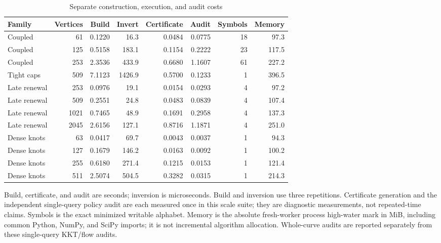 \begin{table}[p]
\centering\small
\caption{Separate construction, execution, and audit costs}\label{tab:phases}
\begin{tabular}{lrrrrrrr}
\toprule
Family & Vertices & Build & Invert & Certificate & Audit & Symbols & Memory \\
\midrule
Coupled & 61 & 0.1220 & 16.3 & 0.0484 & 0.0775 & 18 & 97.3 \\
Coupled & 125 & 0.5158 & 183.1 & 0.1154 & 0.2222 & 23 & 117.5 \\
Coupled & 253 & 2.3536 & 433.9 & 0.6680 & 1.1607 & 61 & 227.2 \\
Tight caps & 509 & 7.1123 & 1426.9 & 0.5700 & 0.1233 & 1 & 396.5 \\
Late renewal & 253 & 0.0976 & 19.1 & 0.0154 & 0.0293 & 4 & 97.2 \\
Late renewal & 509 & 0.2551 & 24.8 & 0.0483 & 0.0839 & 4 & 107.4 \\
Late renewal & 1021 & 0.7465 & 48.9 & 0.1691 & 0.2958 & 4 & 137.3 \\
Late renewal & 2045 & 2.6156 & 127.1 & 0.8716 & 1.1871 & 4 & 251.0 \\
Dense knots & 63 & 0.0417 & 69.7 & 0.0043 & 0.0037 & 1 & 94.3 \\
Dense knots & 127 & 0.1679 & 146.2 & 0.0163 & 0.0092 & 1 & 100.2 \\
Dense knots & 255 & 0.6180 & 271.4 & 0.1215 & 0.0153 & 1 & 121.4 \\
Dense knots & 511 & 2.5074 & 504.5 & 0.3282 & 0.0315 & 1 & 214.3 \\
\bottomrule
\end{tabular}
\par\smallskip\begin{minipage}{\textwidth}\footnotesize Build, certificate, and audit are seconds; inversion is microseconds. Build and inversion use three repetitions. Certificate generation and the independent single-query policy audit are each measured once in this scale suite; they are diagnostic measurements, not repeated-time claims. Symbols is the exact minimized writable alphabet. Memory is the absolute fresh-worker process high-water mark in MiB, including common Python, NumPy, and SciPy imports; it is not incremental algorithm allocation. Whole-curve audits are reported separately from these single-query KKT/flow audits.\end{minipage}
\end{table}
